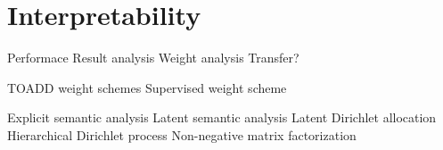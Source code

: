     \section{Interpretability}
        \cite{ribeiro2016should} %




    Performace
    Result analysis
    Weight analysis
    Transfer?



TOADD
weight schemes
Supervised weight scheme


Explicit semantic analysis
Latent semantic analysis
Latent Dirichlet allocation
Hierarchical Dirichlet process
Non-negative matrix factorization
